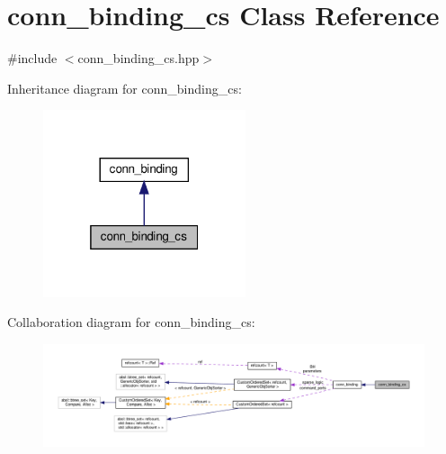 \hypertarget{classconn__binding__cs}{}\section{conn\+\_\+binding\+\_\+cs Class Reference}
\label{classconn__binding__cs}


{\ttfamily \#include $<$conn\+\_\+binding\+\_\+cs.\+hpp$>$}



Inheritance diagram for conn\+\_\+binding\+\_\+cs\+:
\nopagebreak
\begin{figure}[H]
\begin{center}
\leavevmode
\includegraphics[width=169pt]{df/d37/classconn__binding__cs__inherit__graph}
\end{center}
\end{figure}


Collaboration diagram for conn\+\_\+binding\+\_\+cs\+:
\nopagebreak
\begin{figure}[H]
\begin{center}
\leavevmode
\includegraphics[width=350pt]{dd/db7/classconn__binding__cs__coll__graph}
\end{center}
\end{figure}
